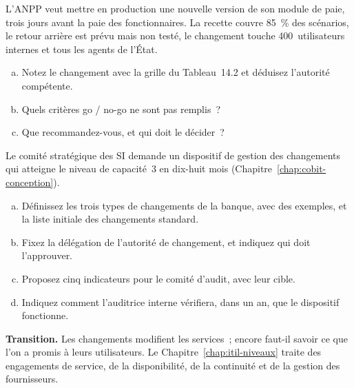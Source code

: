\begin{boxexo}[title={\ding{45}\quad Exercice~14.2. Évaluer un changement \niveaumoyen}]
L'ANPP veut mettre en production une nouvelle version de son module de
paie, trois jours avant la paie des fonctionnaires. La recette couvre
85~\% des scénarios, le retour arrière est prévu mais non testé, le
changement touche 400~utilisateurs internes et tous les agents de l'État.
\begin{enumerate}[(a)]
    \item Notez le changement avec la grille du Tableau~14.2 et déduisez
          l'autorité compétente.
    \item Quels critères go / no-go ne sont pas remplis~?
    \item Que recommandez-vous, et qui doit le décider~?
\end{enumerate}
\end{boxexo}

\begin{boxexo}[title={\ding{45}\quad Exercice~14.3. Refonder la gestion des changements de la BANQUE SANAGA \niveauexpert}]
Le comité stratégique des SI demande un dispositif de gestion des
changements qui atteigne le niveau de capacité~3 en dix-huit mois
(Chapitre~\ref{chap:cobit-conception}).
\begin{enumerate}[(a)]
    \item Définissez les trois types de changements de la banque, avec des
          exemples, et la liste initiale des changements standard.
    \item Fixez la délégation de l'autorité de changement, et indiquez qui
          doit l'approuver.
    \item Proposez cinq indicateurs pour le comité d'audit, avec leur cible.
    \item Indiquez comment l'auditrice interne vérifiera, dans un an, que le
          dispositif fonctionne.
\end{enumerate}
\end{boxexo}

\bigskip

\begin{boxinfo}
\textbf{Transition.} Les changements modifient les services~; encore
faut-il savoir ce que l'on a promis à leurs utilisateurs. Le
Chapitre~\ref{chap:itil-niveaux} traite des engagements de service, de la
disponibilité, de la continuité et de la gestion des fournisseurs.
\end{boxinfo}
